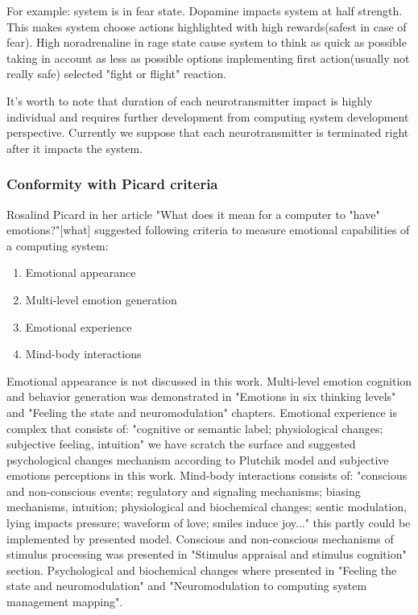 For example: system is in fear state. Dopamine impacts system at half strength. This makes system choose actions highlighted with high rewards(safest in case of fear). High noradrenaline in rage state cause system to think as quick as possible taking in account as less as possible options implementing first action(usually not really safe) selected "fight or flight" reaction.

It's worth to note that duration of each neurotransmitter impact is highly individual and requires further development from computing system development perspective. Currently we suppose that each neurotransmitter is terminated right after it impacts the system.

\subsubsection{Conformity with Picard criteria}

Rosalind Picard in her article "What does it mean for a computer to "have" emotions?"[what] suggested following criteria to measure emotional capabilities of a computing system:

\begin{enumerate}
\item  Emotional appearance
\item  Multi-level emotion generation
\item  Emotional experience
\item  Mind-body interactions
\end{enumerate}

Emotional appearance is not discussed in this work. Multi-level emotion cognition and behavior generation was demonstrated in "Emotions in six thinking levels" and "Feeling the state and neuromodulation" chapters. Emotional experience is complex that consists of:  "cognitive or semantic label; physiological changes; subjective feeling, intuition" we have scratch the surface and suggested psychological changes mechanism according to Plutchik model and subjective emotions perceptions in this work. Mind-body interactions consists of: "conscious and non-conscious events; regulatory and signaling mechanisms; biasing mechanisms, intuition; physiological and biochemical changes; sentic modulation, lying impacts pressure; waveform of love; smiles induce joy..." this partly could be implemented by presented model. Conscious and non-conscious mechanisms of stimulus processing was presented in "Stimulus appraisal and stimulus cognition" section. Psychological and biochemical changes where presented in "Feeling the state and neuromodulation" and "Neuromodulation to computing system management mapping".

